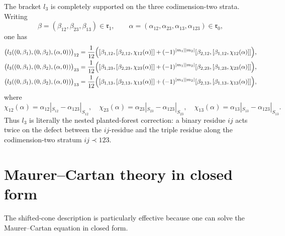 \begin{remark}
\label{rem:l3-componentwise-fm3}
The bracket $l_3$ is completely supported on the three codimension-two strata.
Writing
\[
\beta=(\beta_{12},\beta_{23},\beta_{13}) \in \mathfrak r_1,
\qquad
\alpha=(\alpha_{12},\alpha_{23},\alpha_{13},\alpha_{123}) \in \mathfrak r_0,
\]
one has
\begin{align*}
\bigl(l_3((0,\beta_1),(0,\beta_2),(\alpha,0))\bigr)_{12}
&=
\frac1{12}\Bigl([\beta_{1,12},[\beta_{2,12},\chi_{12}(\alpha)]]
+(-1)^{|m_1||m_2|}[\beta_{2,12},[\beta_{1,12},\chi_{12}(\alpha)]]\Bigr),\\
\bigl(l_3((0,\beta_1),(0,\beta_2),(\alpha,0))\bigr)_{23}
&=
\frac1{12}\Bigl([\beta_{1,23},[\beta_{2,23},\chi_{23}(\alpha)]]
+(-1)^{|m_1||m_2|}[\beta_{2,23},[\beta_{1,23},\chi_{23}(\alpha)]]\Bigr),\\
\bigl(l_3((0,\beta_1),(0,\beta_2),(\alpha,0))\bigr)_{13}
&=
\frac1{12}\Bigl([\beta_{1,13},[\beta_{2,13},\chi_{13}(\alpha)]]
+(-1)^{|m_1||m_2|}[\beta_{2,13},[\beta_{1,13},\chi_{13}(\alpha)]]\Bigr),
\end{align*}
where
\[
\chi_{12}(\alpha)=\alpha_{12}|_{S_{12}}-\alpha_{123}|_{S_{12}},
\quad
\chi_{23}(\alpha)=\alpha_{23}|_{S_{23}}-\alpha_{123}|_{S_{23}},
\quad
\chi_{13}(\alpha)=\alpha_{13}|_{S_{13}}-\alpha_{123}|_{S_{13}}.
\]
Thus $l_3$ is literally the nested planted-forest correction:
a binary residue $ij$ acts twice on the defect between the $ij$-residue and the
triple residue along the codimension-two stratum $ij\prec 123$.
\end{remark}

\section{Maurer--Cartan theory in closed form}
\label{sec:fm3-mc-theory}

The shifted-cone description is particularly effective because one can solve the
Maurer--Cartan equation in closed form.

